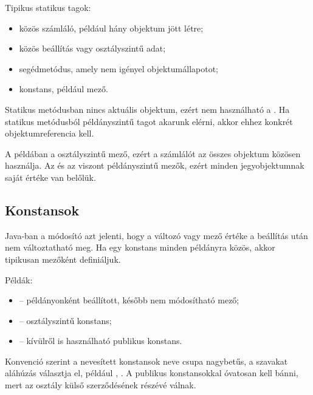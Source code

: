 Tipikus statikus tagok:

\begin{itemize}
  \item közös számláló, például hány objektum jött létre;
  \item közös beállítás vagy osztályszintű adat;
  \item segédmetódus, amely nem igényel objektumállapotot;
  \item konstans, például  mező.
\end{itemize}

Statikus metódusban nincs aktuális objektum, ezért nem használható a . Ha statikus metódusból példányszintű tagot akarunk elérni, akkor ehhez konkrét objektumreferencia kell.

\begin{center}

\end{center}


A példában a  osztályszintű mező, ezért a számlálót az összes objektum közösen használja. Az  és az  viszont példányszintű mezők, ezért minden jegyobjektumnak saját értéke van belőlük.

\subsection{Konstansok}

Java-ban a  módosító azt jelenti, hogy a változó vagy mező értéke a beállítás után nem változtatható meg. Ha egy konstans minden példányra közös, akkor tipikusan  mezőként definiáljuk.

Példák:

\begin{itemize}
  \item {} -- példányonként beállított, később nem módosítható mező;
  \item {} -- osztályszintű konstans;
  \item {} -- kívülről is használható publikus konstans.
\end{itemize}

Konvenció szerint a nevesített konstansok neve csupa nagybetűs, a szavakat aláhúzás választja el, például , . A publikus konstansokkal óvatosan kell bánni, mert az osztály külső szerződésének részévé válnak.

